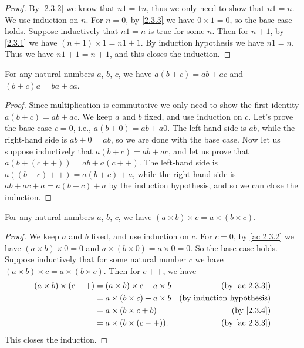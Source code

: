 \begin{proof}
  By \cref{2.3.2} we know that \(n1 = 1n\), thus we only need to show that \(n1 = n\).
  We use induction on \(n\).
  For \(n=0\), by \cref{2.3.3} we have \(0 \times 1 = 0\), so the base case holds.
  Suppose inductively that \(n1 = n\) is true for some \(n\).
  Then for \(n + 1\), by \cref{2.3.1} we have \((n + 1) \times 1 = n1 + 1\).
  By induction hypothesis we have \(n1 = n\).
  Thus we have \(n1 + 1 = n + 1\), and this closes the induction.
\end{proof}

\begin{proposition}\label{2.3.4}
  For any natural numbers \(a\), \(b\), \(c\), we have \(a(b + c) = ab + ac\) and \((b + c)a = ba + ca\).
\end{proposition}

\begin{proof}
  Since multiplication is commutative we only need to show the first identity \(a(b + c) = ab + ac\).
  We keep \(a\) and \(b\) fixed, and use induction on \(c\).
  Let's prove the base case \(c = 0\), i.e., \(a(b + 0) = ab + a0\).
  The left-hand side is \(ab\), while the right-hand side is \(ab + 0 = ab\), so we are done with the base case.
  Now let us suppose inductively that \(a(b + c) = ab + ac\), and let us prove that \(a(b + (c++)) = ab + a(c++)\).
  The left-hand side is \(a((b + c)++) = a(b + c) + a\), while the right-hand side is \(ab + ac + a = a(b + c) + a\) by the induction hypothesis, and so we can close the induction.
\end{proof}

\begin{proposition}\label{2.3.5}
  For any natural numbers \(a\), \(b\), \(c\), we have \((a \times b) \times c = a \times (b \times c)\).
\end{proposition}

\begin{proof}
  We keep \(a\) and \(b\) fixed, and use induction on \(c\).
  For \(c = 0\), by \cref{ac 2.3.2} we have \((a \times b) \times 0 = 0\) and \(a \times (b \times 0) = a \times 0 = 0\).
  So the base case holds.
  Suppose inductively that for some natural number \(c\) we have \((a \times b) \times c = a \times (b \times c)\).
  Then for \(c++\), we have
  \begin{align*}
    (a \times b) \times (c++) & = (a \times b) \times c + a \times b & \text{(by \cref{ac 2.3.3})}      \\
                              & = a \times (b \times c) + a \times b & \text{(by induction hypothesis)} \\
                              & = a \times (b \times c + b)          & \text{(by \cref{2.3.4})}         \\
                              & = a \times (b \times (c++)).         & \text{(by \cref{ac 2.3.3})}
  \end{align*}
  This closes the induction.
\end{proof}


